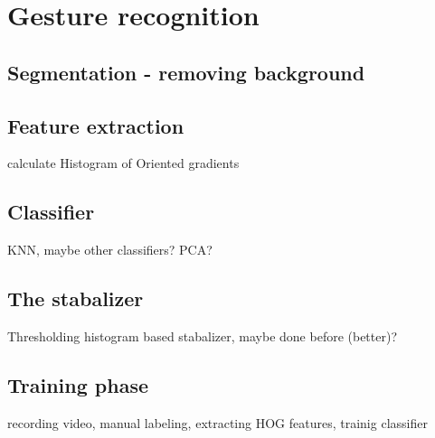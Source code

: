 \chapter{Gesture recognition}
\label{ch:gestures}


\section{Segmentation - removing background}

\section{Feature extraction}
calculate Histogram of Oriented gradients\cite{watanabe2009}

\section{Classifier}
KNN, maybe other classifiers? PCA?

\section{The stabalizer}
Thresholding histogram based stabalizer, maybe done before (better)?

\section{Training phase}
recording video, manual labeling, extracting HOG features, trainig classifier